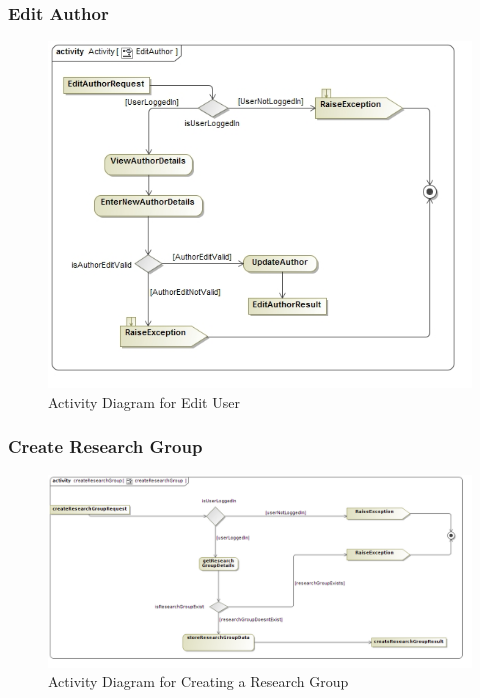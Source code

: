 \documentclass[a4paper,10pt]{article}
\begin{document}
	
\subsubsection{Edit Author}
	\begin{figure}[H]
		\includegraphics[scale=0.5]{ActEditAuthor}
		\caption{Activity Diagram for Edit User}
	\end{figure}

\subsubsection{Create Research Group}
	\begin{figure}[H]
		\includegraphics[scale=0.5]{createResearchGroupAct}
	\caption{Activity Diagram for Creating a Research Group}
	\end{figure}
\end{document}
